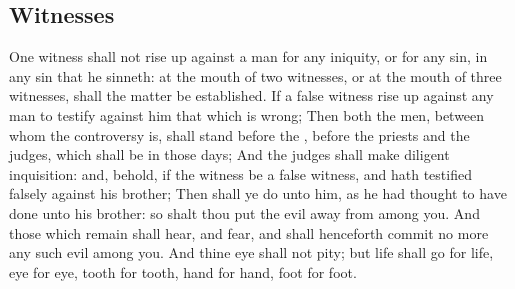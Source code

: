 \begin{biblechapter}
\section*{Witnesses}
\verse One witness shall not rise up against a man for any iniquity, or for any sin, in any sin that he sinneth: at the mouth of two witnesses, or at the mouth of three witnesses, shall the matter be established.
\verse If a false witness rise up against any man to testify against him that which is wrong;
\verse Then both the men, between whom the controversy is, shall stand before the \LORD, before the priests and the judges, which shall be in those days;
\verse And the judges shall make diligent inquisition: and, behold, if the witness be a false witness, and hath testified falsely against his brother;
\verse Then shall ye do unto him, as he had thought to have done unto his brother: so shalt thou put the evil away from among you.
\verse And those which remain shall hear, and fear, and shall henceforth commit no more any such evil among you.
\verse And thine eye shall not pity; but life shall go for life, eye for eye, tooth for tooth, hand for hand, foot for foot.
\end{biblechapter}

